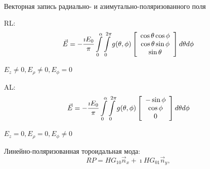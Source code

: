 \documentclass[9pt, compress, xcolor=table]{beamer}
\begin{document}
\begin{frame}{Векторная запись радиально- и азимутально-поляризованного поля}

RL:
\begin{equation*}
\begin{gathered}
\vec E = -\frac{\imath E_0}{\pi}\int \limits_0^{\alpha}\int \limits_0^{2 \pi}g(\theta, \phi)
\left[\array{c} \cos \theta \cos \phi \\ \cos \theta \sin \phi \\ \sin \theta \endarray\right]d\theta d\phi
\end{gathered}
\end{equation*}

$E_z \neq 0, E_{\rho} \neq 0, E_{\phi} = 0$

\medskip

AL:
\begin{equation*}
\begin{gathered}
\vec E = -\frac{\imath E_0}{\pi}\int \limits_0^{\alpha}\int \limits_0^{2 \pi}g(\theta, \phi)
\left[\array{c} - \sin \phi \\ \cos \phi \\ 0 \endarray\right]d\theta d\phi
\end{gathered}
\end{equation*}

$E_z = 0, E_{\rho} = 0, E_{\phi} \neq 0$

\begin{block}{Линейно-поляризованная тороидальная мода: }
\begin{equation*}
RP = HG_{10} \vec n_x + \imath HG_{01}\vec n_y,
\end{equation*}
\end{block}

\end{frame}
\end{document}
